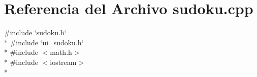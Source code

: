 \section{Referencia del Archivo sudoku.\-cpp}
\label{sudoku_8cpp}
{\ttfamily \#include \char`\"{}sudoku.\-h\char`\"{}}\\*
{\ttfamily \#include \char`\"{}ui\-\_\-sudoku.\-h\char`\"{}}\\*
{\ttfamily \#include $<$math.\-h$>$}\\*
{\ttfamily \#include $<$iostream$>$}\\*
